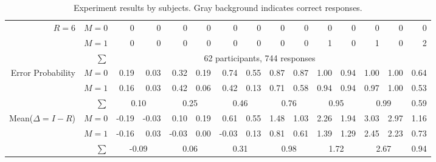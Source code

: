 \begin{table}
\begin{center}
\begin{tabular}{rrrrrrrrrrrrrrr}
\midrule
\multirow{2}{*}{$R=6$} & $M=0$ & 0 & 0 & 0 & 0 & 0 & 0 & 0 & 0 & 0 & 0 & \cellcolor[gray]{0.9} 0 & \cellcolor[gray]{0.9} 0 & 0 \\
 & $M=1$ & 0 & 0 & 0 & 0 & 0 & 0 & 0 & 0 & 1 & 0 & \cellcolor[gray]{0.9} 1 & \cellcolor[gray]{0.9} 0 & 2 \\ 
\midrule 
 &  $\sum$& \multicolumn{12}{c}{62 participants, 744 responses} & \\    
\midrule[1pt]
\multirow{3}{*}{Error Probability} & $M=0$ & 0.19 & 0.03 & 0.32 & 0.19 & 0.74 & 0.55 & 0.87 & 0.87 & 1.00 & 0.94 & 1.00 & 1.00 & 0.64 \\ 
 & $M=1$ & 0.16 & 0.03 & 0.42 & 0.06 & 0.42 & 0.13 & 0.71 & 0.58 & 0.94 & 0.94 & 0.97 & 1.00 & 0.53 \\ \cmidrule(r){3-4} \cmidrule(lr){5-6} \cmidrule(lr){7-8} \cmidrule(lr){9-10} \cmidrule(lr){11-12} \cmidrule(lr){13-14} \cmidrule(l){15-15}
 & $\sum$ & \multicolumn{2}{c}{0.10} & \multicolumn{ 2}{c}{0.25} & \multicolumn{2}{c}{0.46} & \multicolumn{2}{c}{0.76} & \multicolumn{ 2}{c}{0.95} & \multicolumn{2}{c}{0.99} & 0.59 \\  
\midrule
\multirow{3}{*}{Mean($\Delta = I-R$)} & $M=0$ & -0.19 & -0.03 & 0.10 & 0.19 & 0.61 & 0.55 & 1.48 & 1.03 & 2.26 & 1.94 & 3.03 & 2.97 & 1.16 \\ 
 & $M=1$ & -0.16 & 0.03 & -0.03 & 0.00 & -0.03 & 0.13 & 0.81 & 0.61 & 1.39 & 1.29 & 2.45 & 2.23 & 0.73 \\ \cmidrule(r){3-4} \cmidrule(lr){5-6} \cmidrule(lr){7-8} \cmidrule(lr){9-10} \cmidrule(lr){11-12} \cmidrule(lr){13-14} \cmidrule(l){15-15}
 & $\sum$ & \multicolumn{2}{c}{-0.09} & \multicolumn{2}{c}{0.06} & \multicolumn{2}{c}{0.31} & \multicolumn{2}{c}{0.98} & \multicolumn{ 2}{c}{1.72} & \multicolumn{2}{c}{2.67} & 0.94 \\ 
\bottomrule[1.5pt]
\end{tabular}
\end{center}
\caption{Experiment results by subjects. Gray background indicates correct responses.}
\label{tab:resultsoverall}
\end{table}
